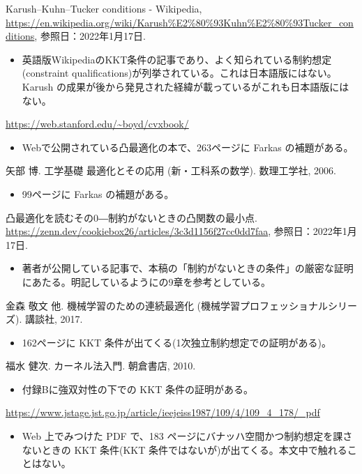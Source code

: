 \documentclass[b5paper,xelatex,ja=standard,10pt]{bxjsarticle}
\begin{document}
\begin{thebibliography}{99}
     Karush–Kuhn–Tucker conditions - Wikipedia, \url{https://en.wikipedia.org/wiki/Karush%E2%80%93Kuhn%E2%80%93Tucker_conditions}, 参照日：2022年1月17日.
    \begin{itemize}
        \item 英語版WikipediaのKKT条件の記事であり、よく知られている制約想定(constraint qualifications)が列挙されている。これは日本語版にはない。Karush の成果が後から発見された経緯が載っているがこれも日本語版にはない。
    \end{itemize}
     \url{https://web.stanford.edu/~boyd/cvxbook/}
    \begin{itemize}
        \item Webで公開されている凸最適化の本で、263ページに Farkas の補題がある。
    \end{itemize}
     矢部 博. 工学基礎 最適化とその応用 (新・工科系の数学). 数理工学社, 2006.
    \begin{itemize}
        \item 99ページに Farkas の補題がある。
    \end{itemize}
     凸最適化を読むその0―制約がないときの凸関数の最小点. \url{https://zenn.dev/cookiebox26/articles/3c3d1156f27cc0dd7faa}, 参照日：2022年1月17日.
    \begin{itemize}
        \item 著者が公開している記事で、本稿の「制約がないときの条件」の厳密な証明にあたる。明記しているように\cite{boyd}の9章を参考としている。
    \end{itemize}
     金森 敬文 他. 機械学習のための連続最適化 (機械学習プロフェッショナルシリーズ). 講談社, 2017.
    \begin{itemize}
        \item 162ページに KKT 条件が出てくる(1次独立制約想定での証明がある)。
    \end{itemize}
     福水 健次. カーネル法入門. 朝倉書店, 2010.
    \begin{itemize}
        \item 付録Bに強双対性の下での KKT 条件の証明がある。
    \end{itemize}
     \url{https://www.jstage.jst.go.jp/article/ieejeiss1987/109/4/109_4_178/_pdf}
    \begin{itemize}
        \item Web 上でみつけた PDF で、183 ページにバナッハ空間かつ制約想定を課さないときの KKT 条件(KKT 条件ではないが)が出てくる。本文中で触れることはない。
    \end{itemize}
\end{thebibliography}
\end{document}
